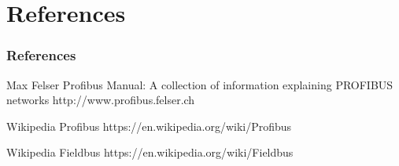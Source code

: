 \documentclass{beamer}
\begin{document}
\section*{References}
\begin{frame}[allowframebreaks]
  \frametitle{References}
  \begin{thebibliography}{10}
  \beamertemplatebookbibitems
    Max Felser
    \newblock Profibus Manual: A collection of information explaining PROFIBUS networks
    \newblock http://www.profibus.felser.ch

    Wikipedia
    \newblock Profibus
    \newblock https://en.wikipedia.org/wiki/Profibus

    Wikipedia
    \newblock Fieldbus
    \newblock https://en.wikipedia.org/wiki/Fieldbus
   \end{thebibliography}
 \end{frame}
\end{document}
